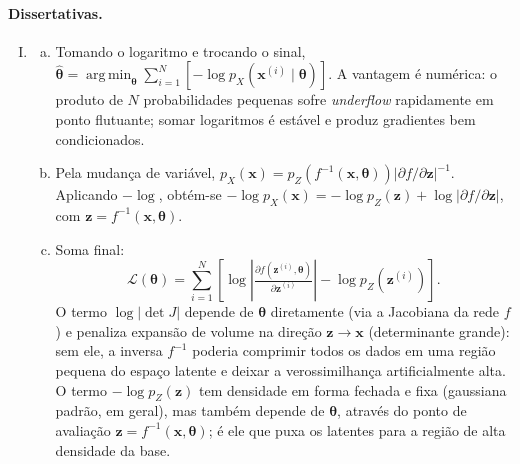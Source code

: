 \documentclass{dlproblemset}
\newcommand{\thetav}{\boldsymbol{\theta}}
\DeclareMathOperator*{\argmin}{arg\,min}
\begin{document}
\paragraph{Dissertativas.}
\begin{enumerate}[I)]
    \item
    \begin{enumerate}[(a)]
        \item Tomando o logaritmo e trocando o sinal, $\hat{\thetav} = \argmin_{\thetav}\sum_{i=1}^{N}\left[-\log p_X(\mathbf{x}^{(i)} \mid \thetav)\right]$. A vantagem é numérica: o produto de $N$ probabilidades pequenas sofre \textit{underflow} rapidamente em ponto flutuante; somar logaritmos é estável e produz gradientes bem condicionados.
        \item Pela mudança de variável, $p_X(\mathbf{x}) = p_Z(f^{-1}(\mathbf{x}, \thetav))\left|\partial f / \partial \mathbf{z}\right|^{-1}$. Aplicando $-\log$, obtém-se $-\log p_X(\mathbf{x}) = -\log p_Z(\mathbf{z}) + \log|\partial f / \partial \mathbf{z}|$, com $\mathbf{z} = f^{-1}(\mathbf{x}, \thetav)$.
        \item Soma final:
        \[
            \mathcal{L}(\thetav) = \sum_{i=1}^{N}\left[\log\left|\tfrac{\partial f(\mathbf{z}^{(i)},\thetav)}{\partial \mathbf{z}^{(i)}}\right| - \log p_Z(\mathbf{z}^{(i)})\right].
        \]
        O termo $\log|\det J|$ depende de $\thetav$ diretamente (via a Jacobiana da rede $f$) e penaliza expansão de volume na direção $\mathbf{z} \to \mathbf{x}$ (determinante grande): sem ele, a inversa $f^{-1}$ poderia comprimir todos os dados em uma região pequena do espaço latente e deixar a verossimilhança artificialmente alta. O termo $-\log p_Z(\mathbf{z})$ tem densidade em forma fechada e fixa (gaussiana padrão, em geral), mas também depende de $\thetav$, através do ponto de avaliação $\mathbf{z} = f^{-1}(\mathbf{x}, \thetav)$; é ele que puxa os latentes para a região de alta densidade da base.
    \end{enumerate}


\end{enumerate}
\end{document}
